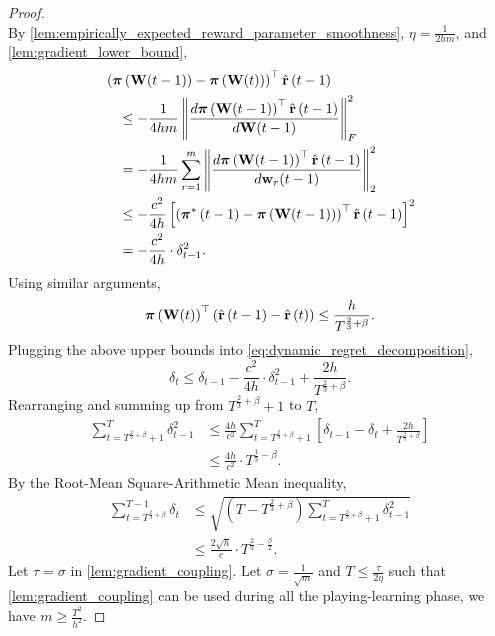 \begin{proof}
\begin{equation*}
\end{equation*}
By \cref{lem:empirically_expected_reward_parameter_smoothness}, $\eta = \frac{1}{2 h m}$, and \cref{lem:gradient_lower_bound},
\begin{equation*}
\begin{split}
    &\left( {\boldsymbol{\pi}}\left( {\mathbf{W}}(t-1) \right) - {\boldsymbol{\pi}}\left( {\mathbf{W}}(t) \right) \right)^\top \hat{{\mathbf{r}}}\left(t-1\right) \\
    &\quad \le - \frac{1}{4 h m} \left\| \frac{d {\boldsymbol{\pi}}\left( {\mathbf{W}}(t-1) \right)^\top \hat{{\mathbf{r}}}\left(t-1\right)}{d {\mathbf{W}}(t-1)} \right\|_F^2 \\
    &\quad = - \frac{1}{4 h m} \sum\limits_{r=1}^{m}{ \left\| \frac{d {\boldsymbol{\pi}}\left( {\mathbf{W}}(t-1) \right)^\top \hat{{\mathbf{r}}}\left(t-1\right)}{d {\mathbf{w}}_r(t-1)} \right\|_2^2 } \\
    &\quad \le - \frac{c^2}{4 h} \left[ \left( {{\boldsymbol{\pi}}^*\left(t-1\right)} - {\boldsymbol{\pi}}\left( {\mathbf{W}}(t-1) \right) \right)^\top \hat{{\mathbf{r}}}\left(t-1\right)  \right]^2 \\
    &\quad = - \frac{c^2}{4 h} \cdot \delta_{t-1}^2.
\end{split}
\end{equation*}
Using similar arguments,
\begin{equation*}
    {\boldsymbol{\pi}}\left( {\mathbf{W}}(t) \right)^\top \left( \hat{{\mathbf{r}}}\left(t-1\right) - \hat{{\mathbf{r}}}\left(t\right)  \right) \le \frac{h}{T^{\frac{2}{3} + \beta}}.
\end{equation*}
Plugging the above upper bounds into \cref{eq:dynamic_regret_decomposition},
\begin{equation*}
    \delta_t \le \delta_{t-1} - \frac{c^2}{4 h} \cdot \delta_{t-1}^2 + \frac{2h}{T^{\frac{2}{3} + \beta}}.
\end{equation*}
Rearranging and summing up from $T^{\frac{2}{3} + \beta} + 1$ to $T$,
\begin{equation*}
\begin{split}
    \sum\limits_{t=T^{\frac{2}{3}+ \beta}+1}^{T}{\delta_{t-1}^2} &\le \frac{4 h}{ c^2} \sum\limits_{t=T^{\frac{2}{3}+ \beta}+1}^{T} { \left[ \delta_{t-1} - \delta_t + \frac{2h}{T^{\frac{2}{3} + \beta}} \right] } \\
    &\le \frac{4 h}{ c^2} \cdot T^{\frac{1}{3} - \beta}.
\end{split}
\end{equation*}
By the Root-Mean Square-Arithmetic Mean inequality,
\begin{equation*}
\begin{split}
    \sum\limits_{t=T^{\frac{2}{3}+ \beta}}^{T-1}{\delta_{t}} &\le \sqrt{\left(T  - T^{\frac{2}{3}+ \beta} \right) \sum\limits_{t=T^{\frac{2}{3}+ \beta}+1}^{T}{\delta_{t-1}^2}} \\
    &\le \frac{2 \sqrt{h}}{c} \cdot T^{\frac{2}{3} - \frac{\beta}{2}}.
\end{split}
\end{equation*}
Let $\tau = \sigma$ in \cref{lem:gradient_coupling}. Let $\sigma = \frac{1}{\sqrt{m}}$ and $T \le \frac{\tau}{2 \eta}$ such that \cref{lem:gradient_coupling} can be used during all the playing-learning phase, we have $m \ge \frac{T^2}{h^2}$.
\end{proof}



